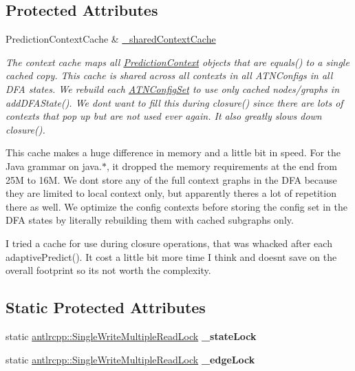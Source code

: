\subsection*{Protected Attributes}
\begin{DoxyCompactItemize}
\item 
Prediction\+Context\+Cache \& \hyperlink{classantlr4_1_1atn_1_1ATNSimulator_a73bf77d58d1457cc0543600da3201bea}{\+\_\+shared\+Context\+Cache}
\begin{DoxyCompactList}\small\item\em The context cache maps all \hyperlink{classantlr4_1_1atn_1_1PredictionContext}{Prediction\+Context} objects that are equals() to a single cached copy. This cache is shared across all contexts in all A\+T\+N\+Configs in all D\+FA states. We rebuild each \hyperlink{classantlr4_1_1atn_1_1ATNConfigSet}{A\+T\+N\+Config\+Set} to use only cached nodes/graphs in add\+D\+F\+A\+State(). We don\textquotesingle{}t want to fill this during closure() since there are lots of contexts that pop up but are not used ever again. It also greatly slows down closure(). 

This cache makes a huge difference in memory and a little bit in speed. For the Java grammar on java.$\ast$, it dropped the memory requirements at the end from 25M to 16M. We don\textquotesingle{}t store any of the full context graphs in the D\+FA because they are limited to local context only, but apparently there\textquotesingle{}s a lot of repetition there as well. We optimize the config contexts before storing the config set in the D\+FA states by literally rebuilding them with cached subgraphs only. 

I tried a cache for use during closure operations, that was whacked after each adaptive\+Predict(). It cost a little bit more time I think and doesn\textquotesingle{}t save on the overall footprint so it\textquotesingle{}s not worth the complexity. \end{DoxyCompactList}\end{DoxyCompactItemize}
\subsection*{Static Protected Attributes}
\begin{DoxyCompactItemize}
\item 
\mbox{\label{classantlr4_1_1atn_1_1ATNSimulator_a0ceff3caefbd8f9067c549fdf60e973b}} 
static \hyperlink{classantlrcpp_1_1SingleWriteMultipleReadLock}{antlrcpp\+::\+Single\+Write\+Multiple\+Read\+Lock} {\bfseries \+\_\+state\+Lock}
\item 
\mbox{\label{classantlr4_1_1atn_1_1ATNSimulator_ab3c0921267abe8227f51aa4f1201a82a}} 
static \hyperlink{classantlrcpp_1_1SingleWriteMultipleReadLock}{antlrcpp\+::\+Single\+Write\+Multiple\+Read\+Lock} {\bfseries \+\_\+edge\+Lock}
\end{DoxyCompactItemize}



